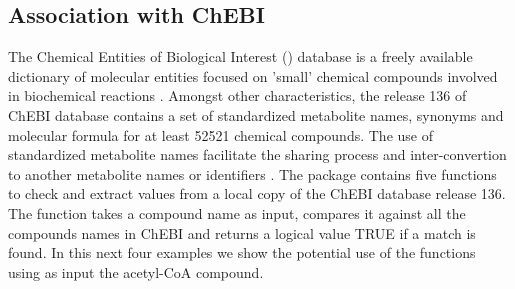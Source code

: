 \subsection{Association with ChEBI}
The Chemical Entities of Biological Interest () database  is a freely available dictionary of molecular entities focused on 'small' chemical compounds involved in biochemical reactions \citep{Degtyarenko2007}. Amongst other characteristics, the release 136 of ChEBI database contains a set of standardized metabolite names, synonyms and molecular formula for at least 52521 chemical compounds. The use of standardized metabolite names facilitate the sharing process and inter-convertion to another metabolite names  or identifiers \citep{Bernard2014, Ravikrishnan2015}. The  package contains five functions to check and extract values from a local copy of the ChEBI database release 136. The  function takes a compound name as input, compares it against all the compounds names in ChEBI and returns a logical value TRUE if a match is found. In this next four examples we show the potential use of the functions using as input the acetyl-CoA compound.
